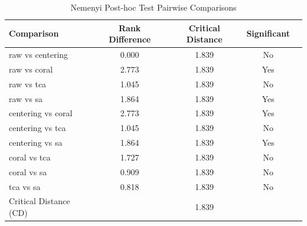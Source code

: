 \begin{table}[htbp]
\centering
\caption{Nemenyi Post-hoc Test Pairwise Comparisons}
\label{tab:nemenyi}
\begin{tabular}{lcccc}
\toprule
Comparison & Rank Difference & Critical Distance & Significant \\
\midrule
raw vs centering & 0.000 & 1.839 & No \\
raw vs coral & 2.773 & 1.839 & Yes \\
raw vs tca & 1.045 & 1.839 & No \\
raw vs sa & 1.864 & 1.839 & Yes \\
centering vs coral & 2.773 & 1.839 & Yes \\
centering vs tca & 1.045 & 1.839 & No \\
centering vs sa & 1.864 & 1.839 & Yes \\
coral vs tca & 1.727 & 1.839 & No \\
coral vs sa & 0.909 & 1.839 & No \\
tca vs sa & 0.818 & 1.839 & No \\
\midrule
Critical Distance (CD) & & 1.839 & \\
\bottomrule
\end{tabular}
\end{table}